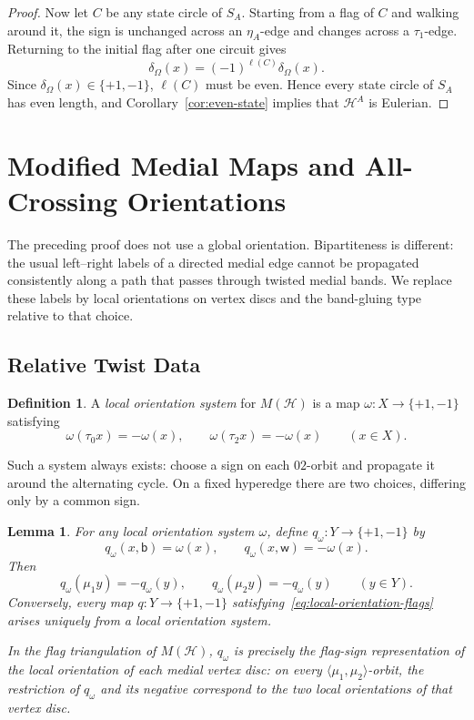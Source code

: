 \documentclass[10pt,a4paper]{article}
\newtheorem{lemma}[theorem]{Lemma}
\theoremstyle{definition}
\newtheorem{definition}[theorem]{Definition}
\theoremstyle{remark}
\newcommand{\Hcal}{\mathcal{H}}
\begin{document}
\begin{proof}
Now let $C$ be any state circle of $S_A$. Starting from a flag of $C$ and walking around it, the sign is unchanged across an $\eta_A$-edge and changes across a $\tau_1$-edge. Returning to the initial flag after one circuit gives
\[
  \delta_\Omega(x)=(-1)^{\ell(C)}\delta_\Omega(x).
\]
Since $\delta_\Omega(x)\in\{+1,-1\}$, $\ell(C)$ must be even. Hence every state circle of $S_A$ has even length, and Corollary~\ref{cor:even-state} implies that $\Hcal^A$ is Eulerian.
\end{proof}


\section{Modified Medial Maps and All-Crossing Orientations}

The preceding proof does not use a global orientation. Bipartiteness is different: the usual left--right labels of a directed medial edge cannot be propagated consistently along a path that passes through twisted medial bands. We replace these labels by local orientations on vertex discs and the band-gluing type relative to that choice.

\subsection{Relative Twist Data}

\begin{definition}\label{def:local-orientation}
A \emph{local orientation system} for $M(\Hcal)$ is a map $\omega:X\to\{+1,-1\}$ satisfying
\[
 \omega(\tau_0x)=-\omega(x),\qquad \omega(\tau_2x)=-\omega(x)
 \qquad (x\in X).
\]
\end{definition}

Such a system always exists: choose a sign on each $02$-orbit and propagate it around the alternating cycle. On a fixed hyperedge there are two choices, differing only by a common sign.

\begin{lemma}\label{lem:local-orientation-flags}
For any local orientation system $\omega$, define $q_\omega:Y\to\{+1,-1\}$ by
\[
  q_\omega(x,\mathsf b)=\omega(x),\qquad
  q_\omega(x,\mathsf w)=-\omega(x).
\]
Then
\[
  q_\omega(\mu_1y)=-q_\omega(y),\qquad
  q_\omega(\mu_2y)=-q_\omega(y)\qquad(y\in Y). \tag{L}\label{eq:local-orientation-flags}
\]
Conversely, every map $q:Y\to\{+1,-1\}$ satisfying~\eqref{eq:local-orientation-flags} arises uniquely from a local orientation system.

In the flag triangulation of $M(\Hcal)$, $q_\omega$ is precisely the flag-sign representation of the local orientation of each medial vertex disc: on every $\langle\mu_1,\mu_2\rangle$-orbit, the restriction of $q_\omega$ and its negative correspond to the two local orientations of that vertex disc.
\end{lemma}
\end{document}
